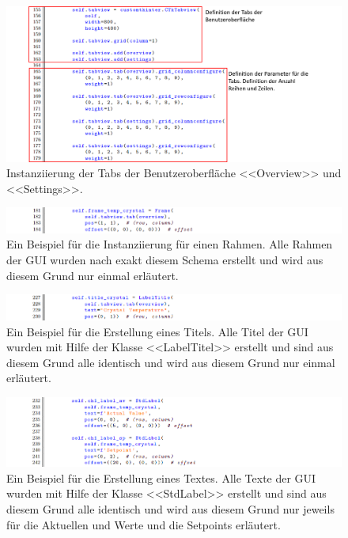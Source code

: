 \begin{appendix}
\begin{landscape}
\begin{figure}[H]
    \centering
    \includegraphics[scale=0.75]{98_images/src/fhnw_pro6m_quellcode_09.png}
    \caption*{Instanziierung der Tabs der Benutzeroberfläche <<Overview>> und <<Settings>>.}
    \label{fig:fhnw_pro6m_quellcode_09}
\end{figure}

\begin{figure}[H]
    \centering
    \includegraphics[scale=0.8]{98_images/src/fhnw_pro6m_quellcode_10.png}
    \caption*{Ein Beispiel für die Instanziierung für einen Rahmen. Alle Rahmen der GUI wurden nach exakt diesem Schema erstellt und wird aus diesem Grund nur einmal erläutert.}
    \label{fig:fhnw_pro6m_quellcode_10}
\end{figure}

\begin{figure}[H]
    \centering
    \includegraphics[scale=0.8]{98_images/src/fhnw_pro6m_quellcode_11.png}
    \caption*{Ein Beispiel für die Erstellung eines Titels. Alle Titel der GUI wurden mit Hilfe der Klasse <<LabelTitel>> erstellt und sind aus diesem Grund alle identisch und wird aus diesem Grund nur einmal erläutert.}
    \label{fig:fhnw_pro6m_quellcode_11}
\end{figure}

\begin{figure}[H]
    \centering
    \includegraphics[scale=0.8]{98_images/src/fhnw_pro6m_quellcode_12.png}
    \caption*{Ein Beispiel für die Erstellung eines Textes. Alle Texte der GUI wurden mit Hilfe der Klasse <<StdLabel>> erstellt und sind aus diesem Grund alle identisch und wird aus diesem Grund nur jeweils für die Aktuellen und Werte und die Setpoints erläutert.}
    \label{fig:fhnw_pro6m_quellcode_12}
\end{figure}


\end{landscape}
\end{appendix}
